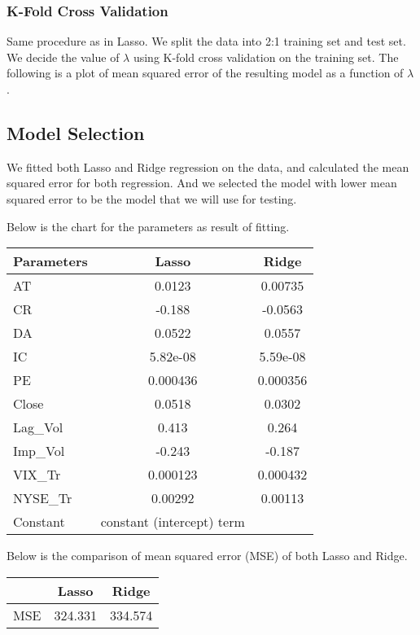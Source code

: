 \documentclass[b4paper]{article}
\begin{document}
\subsubsection{K-Fold Cross Validation}
Same procedure as in Lasso. We split the data into 2:1 training set and test set. We decide the value of $\lambda$ using K-fold cross validation on the training set. The following is a plot of mean squared error of the resulting model as a function of $\lambda$.

\subsection{Model Selection}
We fitted both Lasso and Ridge regression on the data, and calculated the mean squared error for both regression. And we selected the model with lower mean squared error to be the model that we will use for testing.

Below is the chart for the parameters as result of fitting.
\begin{center}
\begin{tabular}{ l | c | c   }
 \hline
Parameters& Lasso & Ridge\\
 \hline
AT & 0.0123 & 0.00735\\
 \hline
CR & -0.188 & -0.0563\\
 \hline
DA & 0.0522 & 0.0557\\
 \hline
IC & 5.82e-08 & 5.59e-08\\
 \hline
PE & 0.000436 & 0.000356\\
 \hline
Close & 0.0518 & 0.0302\\
 \hline
Lag\_Vol & 0.413 & 0.264\\
 \hline
Imp\_Vol & -0.243 & -0.187\\
 \hline
VIX\_Tr & 0.000123 & 0.000432\\
 \hline
NYSE\_Tr & 0.00292 & 0.00113\\
 \hline
Constant & constant (intercept) term\\
\hline
 \end{tabular}
\end{center}   

Below is the comparison of mean squared error (MSE) of both Lasso and Ridge.
\begin{center}
\begin{tabular}{ l | c | c  }
 \hline
 & Lasso & Ridge\\
 \hline
MSE & 324.331 & 334.574\\
\hline
 \end{tabular}
\end{center}   
\end{document}
